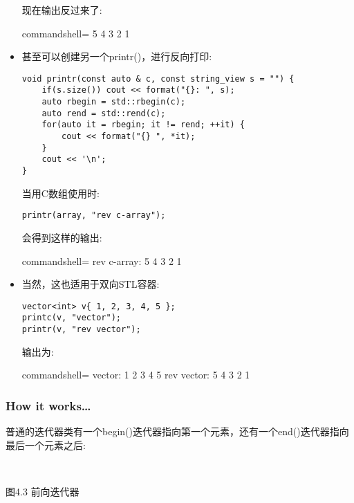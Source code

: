 \begin{itemize}
现在输出反过来了:

\begin{tcblisting}{commandshell={}}
5 4 3 2 1
\end{tcblisting}

\item 
甚至可以创建另一个printr()，进行反向打印:

\begin{lstlisting}[style=styleCXX]
void printr(const auto & c, const string_view s = "") {
	if(s.size()) cout << format("{}: ", s);
	auto rbegin = std::rbegin(c);
	auto rend = std::rend(c);
	for(auto it = rbegin; it != rend; ++it) {
		cout << format("{} ", *it);
	}
	cout << '\n';
}
\end{lstlisting}

当用C数组使用时:

\begin{lstlisting}[style=styleCXX]
printr(array, "rev c-array");
\end{lstlisting}

会得到这样的输出:

\begin{tcblisting}{commandshell={}}
rev c-array: 5 4 3 2 1
\end{tcblisting}

\item 
当然，这也适用于双向STL容器:

\begin{lstlisting}[style=styleCXX]
vector<int> v{ 1, 2, 3, 4, 5 };
printc(v, "vector");
printr(v, "rev vector");
\end{lstlisting}

输出为:

\begin{tcblisting}{commandshell={}}
vector: 1 2 3 4 5
rev vector: 5 4 3 2 1
\end{tcblisting}
\end{itemize}


\subsubsection{How it works…}

普通的迭代器类有一个begin()迭代器指向第一个元素，还有一个end()迭代器指向最后一个元素之后:

\hspace*{\fill} \\ %
\begin{center}

图4.3 前向迭代器
\end{center}

